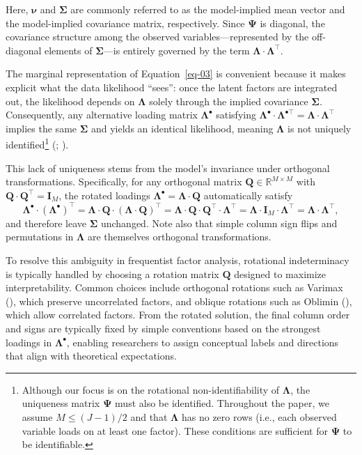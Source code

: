 \documentclass[
  man,
  longtable,
  nolmodern,
  notxfonts,
  notimes,
  colorlinks=true,linkcolor=blue,citecolor=blue,urlcolor=blue]{apa7}
\theoremstyle{plain}
\theoremstyle{plain}
\theoremstyle{remark}
\begin{document}
Here, \(\boldsymbol\nu\) and \(\mathbf\Sigma\) are commonly referred to
as the model-implied mean vector and the model-implied covariance
matrix, respectively. Since \(\mathbf\Psi\) is diagonal, the covariance
structure among the observed variables---represented by the off-diagonal
elements of \(\mathbf\Sigma\)---is entirely governed by the term
\(\mathbf\Lambda\cdot\mathbf\Lambda^\top\).

The marginal representation of Equation~\ref{eq-03} is convenient
because it makes explicit what the data likelihood ``sees'': once the
latent factors are integrated out, the likelihood depends on
\(\mathbf{\Lambda}\) solely through the implied covariance
\(\mathbf{\Sigma}\). Consequently, any alternative loading matrix
\(\mathbf\Lambda^\bullet\) satisfying
\(\mathbf\Lambda^\bullet\cdot\mathbf\Lambda^{\bullet\top}=\mathbf\Lambda\cdot\mathbf\Lambda^\top\)
implies the same \(\mathbf\Sigma\) and yields an identical likelihood,
meaning \(\mathbf\Lambda\) is not uniquely identified\footnote{Although
  our focus is on the rotational non-identifiability of
  \(\mathbf\Lambda\), the uniqueness matrix \(\mathbf\Psi\) must also be
  identified. Throughout the paper, we assume \(M \leq (J-1)/2\) and
  that \(\mathbf\Lambda\) has no zero rows (i.e., each observed variable
  loads on at least one factor). These conditions are sufficient for
  \(\mathbf\Psi\) to be identifiable.}
(;
).

This lack of uniqueness stems from the model's invariance under
orthogonal transformations. Specifically, for any orthogonal matrix
\(\mathbf{Q}\in\mathbb{R}^{M\times M}\) with
\(\mathbf{Q}\cdot\mathbf{Q}^\top=\mathbf{I}_M\), the rotated loadings
\(\mathbf\Lambda^\bullet = \mathbf\Lambda\cdot\mathbf{Q}\) automatically
satisfy \[
\mathbf\Lambda^\bullet\cdot (\mathbf\Lambda^\bullet)^\top = \mathbf\Lambda\cdot \mathbf{Q}\cdot(\mathbf\Lambda\cdot \mathbf{Q})^\top=\mathbf\Lambda\cdot \mathbf{Q}\cdot\mathbf{Q}^\top\cdot \mathbf\Lambda^\top = \mathbf\Lambda\cdot \mathbf{I}_M\cdot \mathbf\Lambda^\top= \mathbf\Lambda \cdot \mathbf\Lambda^\top,
\] and therefore leave \(\mathbf\Sigma\) unchanged. Note also that
simple column sign flips and permutations in \(\mathbf\Lambda\) are
themselves orthogonal transformations.

To resolve this ambiguity in frequentist factor analysis, rotational
indeterminacy is typically handled by choosing a rotation matrix
\(\mathbf{Q}\) designed to maximize interpretability. Common choices
include orthogonal rotations such as Varimax
(), which preserve
uncorrelated factors, and oblique rotations such as Oblimin
(), which
allow correlated factors. From the rotated solution, the final column
order and signs are typically fixed by simple conventions based on the
strongest loadings in \(\mathbf\Lambda^\bullet\), enabling researchers
to assign conceptual labels and directions that align with theoretical
expectations.
\end{document}
